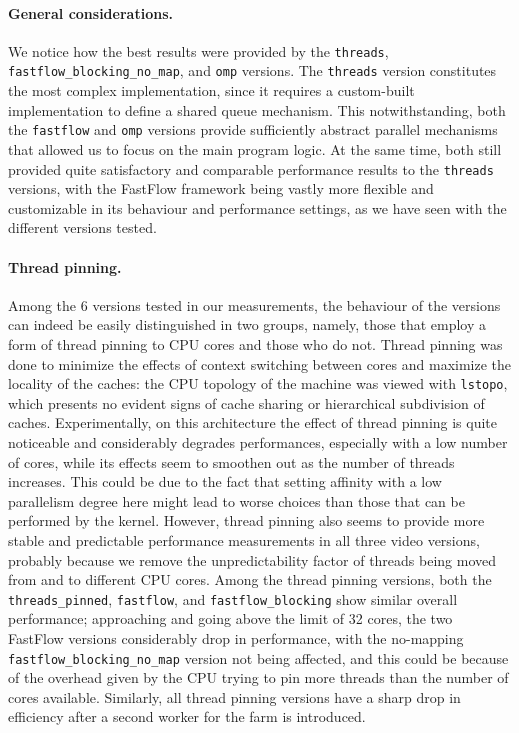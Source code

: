 \documentclass{article}
\begin{document}
\paragraph{General considerations.} We notice how the best results were provided by the \texttt{threads}, \texttt{fastflow\_blocking\_no\_map}, and \texttt{omp} versions. The \texttt{threads} version constitutes the most complex implementation, since it requires a custom-built implementation to define a shared queue mechanism. This notwithstanding, both the \texttt{fastflow} and \texttt{omp} versions provide sufficiently abstract parallel mechanisms that allowed us to focus on the main program logic. At the same time, both still provided quite satisfactory and comparable performance results to the \texttt{threads} versions, with the FastFlow framework being vastly more flexible and customizable in its behaviour and performance settings, as we have seen with the different versions tested.

\paragraph{Thread pinning.} Among the 6 versions tested in our measurements, the behaviour of the versions can indeed be easily distinguished in two groups, namely, those that employ a form of thread pinning to CPU cores and those who do not. Thread pinning was done to minimize the effects of context switching between cores and maximize the locality of the caches: the CPU topology of the machine was viewed with \texttt{lstopo}, which presents no evident signs of cache sharing or hierarchical subdivision of caches. Experimentally, on this architecture the effect of thread pinning is quite noticeable and considerably degrades performances, especially with a low number of cores, while its effects seem to smoothen out as the number of threads increases. This could be due to the fact that setting affinity with a low parallelism degree here might lead to worse choices than those that can be performed by the kernel. However, thread pinning also seems to provide more stable and predictable performance measurements in all three video versions, probably because we remove the unpredictability factor of threads being moved from and to different CPU cores. Among the thread pinning versions, both the \texttt{threads\_pinned}, \texttt{fastflow}, and \texttt{fastflow\_blocking} show similar overall performance; approaching and going above the limit of 32 cores, the two FastFlow versions considerably drop in performance, with the no-mapping \texttt{fastflow\_blocking\_no\_map} version not being affected, and this could be because of the overhead given by the CPU trying to pin more threads than the number of cores available. Similarly, all thread pinning versions have a sharp drop in efficiency after a second worker for the farm is introduced.
\end{document}
